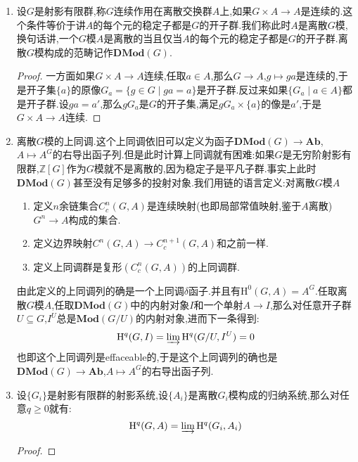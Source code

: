 \begin{enumerate}
	\item 设$G$是射影有限群,称$G$连续作用在离散交换群$A$上,如果$G\times A\to A$是连续的.这个条件等价于讲$A$的每个元的稳定子都是$G$的开子群.我们称此时$A$是离散$G$模,换句话讲,一个$G$模$A$是离散的当且仅当$A$的每个元的稳定子都是$G$的开子群.离散$G$模构成的范畴记作$\textbf{DMod}(G)$.
	\begin{proof}
		
		一方面如果$G\times A\to A$连续,任取$a\in A$,那么$G\to A$,$g\mapsto ga$是连续的,于是开子集$\{a\}$的原像$G_a=\{g\in G\mid ga=a\}$是开子群.反过来如果$\{G_a\mid a\in A\}$都是开子群.设$ga=a'$,那么$gG_a$是$G$的开子集,满足$gG_a\times\{a\}$的像是$a'$,于是$G\times A\to A$连续.
	\end{proof}
	\item 离散$G$模的上同调.这个上同调依旧可以定义为函子$\textbf{DMod}(G)\to\textbf{Ab}$,$A\mapsto A^G$的右导出函子列.但是此时计算上同调就有困难:如果$G$是无穷阶射影有限群,$\mathbb{Z}[G]$作为$G$模就不是离散的,因为稳定子是平凡子群.事实上此时$\textbf{DMod}(G)$甚至没有足够多的投射对象.我们用链的语言定义:对离散$G$模$A$
	\begin{enumerate}[(1)]
		\item 定义$n$余链集合$C^n_{c}(G,A)$是连续映射(也即局部常值映射,鉴于$A$离散)$G^n\to A$构成的集合.
		\item 定义边界映射$C^n(G,A)\to C^{n+1}_c(G,A)$和之前一样.
		\item 定义上同调群是复形$(C^n_c(G,A))$的上同调群.
	\end{enumerate}
	由此定义的上同调列的确是一个上同调$\delta$函子.并且有$\mathrm{H}^0(G,A)=A^G$.任取离散$G$模$A$,任取$\textbf{DMod}(G)$中的内射对象$I$和一个单射$A\to I$,那么对任意开子群$U\subseteq G$,$I^U$总是$\textbf{Mod}(G/U)$的内射对象,进而下一条得到:
	$$\mathrm{H}^q(G,I)=\varinjlim\mathrm{H}^q(G/U,I^U)=0$$
	也即这个上同调列是effaceable的,于是这个上同调列的确也是$\textbf{DMod}(G)\to\textbf{Ab}$,$A\mapsto A^G$的右导出函子列.
	\item 设$\{G_i\}$是射影有限群的射影系统,设$\{A_i\}$是离散$G_i$模构成的归纳系统,那么对任意$q\ge0$就有:
	$$\mathrm{H}^q(G,A)=\varinjlim\mathrm{H}^q(G_i,A_i)$$
	\begin{proof}
		

\end{proof}
\end{enumerate}
